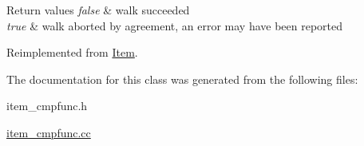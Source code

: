 \begin{DoxyRetVals}{Return values}
{\em false} & walk succeeded \\
\hline
{\em true} & walk aborted by agreement, an error may have been reported \\
\hline
\end{DoxyRetVals}


Reimplemented from \mbox{\hyperlink{classItem_ab7d2529511c14a77e59a1b1bbabc95d7}{Item}}.



The documentation for this class was generated from the following files\+:\begin{DoxyCompactItemize}
\item 
item\+\_\+cmpfunc.\+h\item 
\mbox{\hyperlink{item__cmpfunc_8cc}{item\+\_\+cmpfunc.\+cc}}\end{DoxyCompactItemize}
